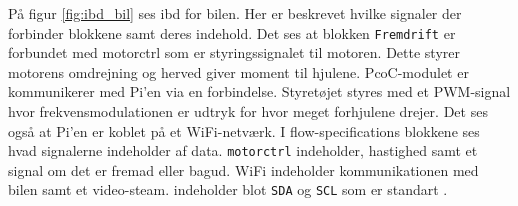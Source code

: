 På figur \ref{fig:ibd_bil} ses ibd for bilen. 
Her er beskrevet hvilke signaler der forbinder blokkene samt deres indehold. 
Det ses at blokken \texttt{Fremdrift} er forbundet med motorctrl som er styringssignalet til motoren. 
Dette styrer motorens omdrejning og herved giver moment til hjulene. 
PcoC-modulet er kommunikerer med Pi'en via en \IIC forbindelse. 
Styretøjet styres med et PWM-signal hvor frekvensmodulationen er udtryk for hvor meget forhjulene drejer. 
Det ses også at Pi'en er koblet på et WiFi-netværk. 
I flow-specifications blokkene ses hvad signalerne indeholder af data. 
\texttt{motorctrl} indeholder, hastighed samt et signal om det er fremad eller bagud. 
WiFi indeholder kommunikationen med bilen samt et video-steam. \IIC indeholder blot \texttt{SDA} og \texttt{SCL} som er standart \IIC. 

\clearpage